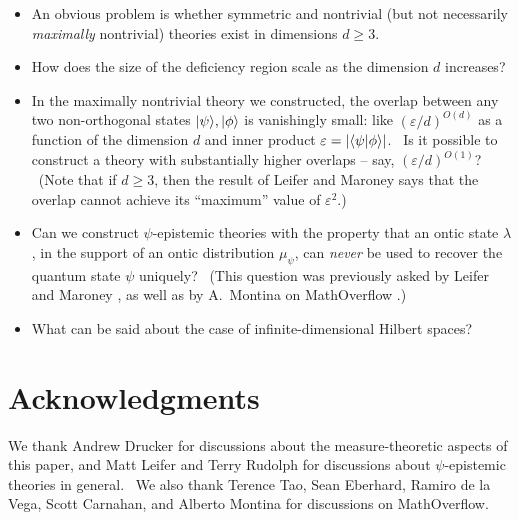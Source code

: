 \documentclass[letterpaper,11pt]{article}
\newcommand{\braket}[2]{\mbox{$ \langle #1 | #2 \rangle $}}
\newcommand{\ket}[1]{\mbox{$ | #1 \rangle $}}
\begin{document}
\begin{itemize}
\item An obvious problem is
whether symmetric and nontrivial (but not necessarily \emph{maximally} nontrivial) theories exist in dimensions $d\geq 3$.

\item How does the size of the deficiency region scale as the dimension $d$ increases?

\item In the maximally nontrivial theory we constructed, the overlap between any two non-orthogonal
states $\ket{\psi},\ket{\phi}$ is vanishingly small: like $(\varepsilon / d)^{O(d)}$ as a function of the dimension $d$ and inner product $\varepsilon = \left| \braket{\psi}{\phi} \right|$. \ Is it possible to construct a theory with substantially higher overlaps -- say, $(\varepsilon / d)^{O(1)}$? \ (Note that if $d\geq 3$, then the result of Leifer and Maroney \cite{marleif} says that the overlap cannot achieve its ``maximum'' value of $\varepsilon^2$.)

\item Can we construct $\psi$-epistemic theories with the property that an ontic state $\lambda$, in the support of an ontic distribution $\mu_{\psi}$, can \emph{never} be used to recover the quantum state $\psi$ uniquely? \ (This question was previously asked by Leifer and Maroney \cite{marleif}, as well as by A.\ Montina on MathOverflow \cite{mathoverflow}.)

\item What can be said about the case of infinite-dimensional Hilbert spaces?

\end{itemize}

\section{Acknowledgments}

We thank Andrew Drucker for discussions about the measure-theoretic aspects of this paper, and Matt Leifer and Terry Rudolph for discussions about $\psi$-epistemic theories in general. \ We also thank Terence Tao, Sean Eberhard, Ramiro de la Vega, Scott Carnahan, and Alberto Montina for discussions on MathOverflow.
\end{document}
